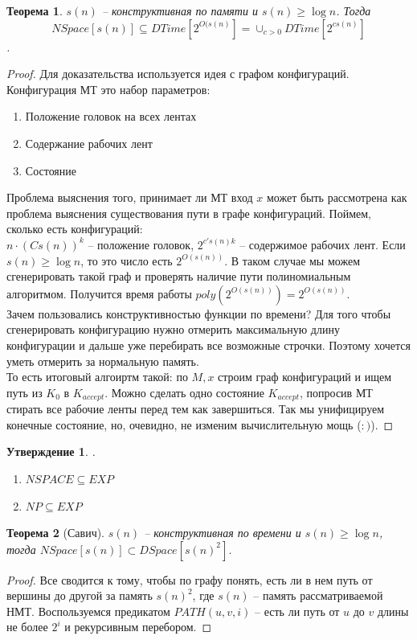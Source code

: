 \documentclass[12pt, letterpaper]{article}
\newtheorem{theorem}{Теорема}[section]
\newtheorem{prop}{Утверждение}[section]
\begin{document}
\begin{theorem}
$s(n)$ -- конструктивная по памяти и $s(n) \geq \log n$. Тогда 
$$NSpace[s(n)] \subseteq DTime[2^{O(s(n)}] = \cup_{c>0} DTime[2^{cs(n)}]$$.
\end{theorem}
\begin{proof}
Для доказательства используется идея с графом конфигураций. Конфигурация МТ это набор параметров:
\begin{enumerate}
\item Положение головок на всех лентах
\item Содержание рабочих лент
\item Состояние
\end{enumerate}
Проблема выяснения того, принимает ли МТ вход $x$ может быть рассмотрена как проблема выяснения существования пути в графе конфигураций.  
 Поймем, сколько есть конфигураций:\\
$n \cdot (C s(n))^k$ -- положение головок, $2^{c' s(n) k}$ -- содержимое рабочих лент. Если $s(n) \geq \log n$, то это число есть $2^{O(s(n))}$. В таком случае мы можем сгенерировать такой граф и проверять наличие пути полиномиальным алгоритмом. Получится время работы $poly(2^{O(s(n))}) = 2^{O(s(n))}$. \\
Зачем пользовались конструктивностью функции по времени? Для того чтобы сгенерировать конфигурацию нужно отмерить максимальную длину конфигурации и дальше уже перебирать все возможные строчки. Поэтому хочется уметь отмерить за нормальную память. \\
То есть итоговый алгоиртм такой: по $M, x$ строим граф конфигураций и ищем путь из $K_0$ в $K_{accept}$. Можно сделать одно состояние $K_{accept}$, попросив МТ стирать все рабочие ленты перед тем как завершиться. Так мы унифицируем конечные состояние, но, очевидно, не изменим вычислительную мощь ($:)$).
\end{proof}

\begin{prop}.
\begin{enumerate}
\item $NSPACE \subseteq EXP$
\item $NP \subseteq EXP$  
\end{enumerate}
\end{prop}

\begin{theorem}[Савич]
$s(n)$ -- конструктивная по времени и $s(n) \geq \log n$, тогда $NSpace[s(n)] \subset DSpace[s(n)^2]$.
\end{theorem}
\begin{proof}
Все сводится к тому, чтобы по графу понять, есть ли в нем путь от вершины до другой за память $s(n)^2$, где $s(n)$ -- память рассматриваемой НМТ. Воспользуемся предикатом $PATH(u,v,i)$ -- есть ли путь от $u$ до $v$ длины не более $2^{i}$ и рекурсивным перебором. 
\end{proof}
\end{document}

